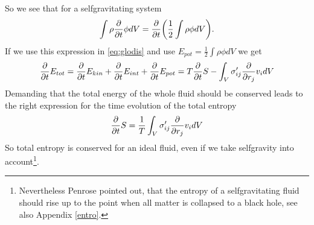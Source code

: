 So we see that for a selfgravitating system
\begin{align}
\int \rho \frac{\partial}{\partial t} \phi dV = \frac{\partial}{\partial t} { \left( \frac{1}{2}\int \rho\phi dV \right) }.
\end{align}
If we use this expression in \eqref{eq:glodis} and use $E_{pot}= \frac{1}{2}\int
\rho \phi dV$ we get
\begin{align}
\frac{\partial}{\partial t} E_{tot} = 
\frac{\partial}{\partial t} E_{kin}+\frac{\partial}{\partial t} E_{int}+\frac{\partial}{\partial t} E_{pot} = 
T \frac{\partial}{\partial t} S - \int_V \sigma'_{ij} \frac{\partial}{\partial r_j} v_i dV
\end{align}
Demanding that the total energy of the whole fluid should be conserved leads to
the right expression for the time evolution of the total entropy
\begin{align}
\frac{\partial}{\partial t} S = \frac{1}{T}\int_V \sigma'_{ij} \frac{\partial}{\partial r_j} v_i dV
\end{align}
So total entropy is conserved for an ideal fluid, even if we take selfgravity
into account\footnote{Nevertheless Penrose \citep{Penrose1989} pointed out,
that the entropy of a selfgravitating fluid should rise up to the point when
all matter is collapsed to a black hole, see also Appendix \ref{entro}.}.

